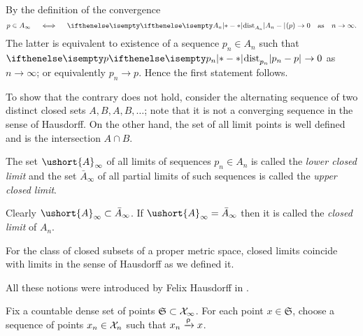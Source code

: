 \begin{comment}

\parbf{Exercise~\ref{ex:geod-CBA}.}
Without loss of generality we can assume that $\kappa=1$.
Fix a sufficiently small $0<\eps<\pi$.

Recall that by Proposition~\ref{cor:loc-geod-are-min}, any local geodesic shorter than $\pi$ in  $\spc{U}$ is a geodesic.

Consider a sequence of directions $\xi_n$ of geodesics $[pq_n]$.
We can assume that the distances $\dist{p}{q_n}{\spc{U}}$ are equal to $\eps$ for all $n$;
here we use that the geodesics are extendable as local geodesics and minimizing up to length $\pi$.

Since $\spc{U}$ is proper,
the sequence $q_n$ has a partial limit, say $q$.
It remains to note that the direction $\xi$ of $[pq]$ is the limit of directions $\xi_n$,
assuming the latter is defined.\qeds

\end{comment}

By the definition of the convergence
\[p\in A_\infty\quad\iff\quad\dist{A_n}{}{}(p)\to 0\quad\text{as}\quad n\to \infty.\] 
The latter is equivalent to existence of a sequence $p_n\in A_n$ such that
$\dist{p_n}{p}{}\to0$ as $n\to \infty$;
or equivalently $p_n\to p$.
Hence the first statement follows.

To show that the contrary does not hold,
consider the alternating sequence of two distinct closed sets $A,B,A,B,\dots$;
note that it is not a converging sequence in the sense of Hausdorff.
On the other hand, the set of all limit points is well defined and is the intersection $A\cap B$.\qeds

 The set $\ushort{A}_\infty$ of all limits  of sequences $p_n\in A_n$ is called the \emph{lower closed limit}
and the set $\bar{A}_\infty$ of all partial limits of such sequences is called the \emph{upper closed limit}.

Clearly $\ushort{A}_\infty\subset \bar{A}_\infty$.
If $\ushort{A}_\infty=\bar{A}_\infty$ then it is called  the \emph{closed limit} of $A_n$.

For the class of closed subsets of a proper metric space, closed limits coincide with limits in the sense of Hausdorff as we defined it.

All these notions were introduced by Felix Hausdorff in \cite{hausdorff}.



Fix a countable dense set of points $\mathfrak{S}\subset\spc{X}_\infty$.
For each point $x\in \mathfrak{S}$, choose a sequence 
of points $x_n\in\spc{X}_n$ such that $x_n\xrightarrow{\upvarrho} x$.

